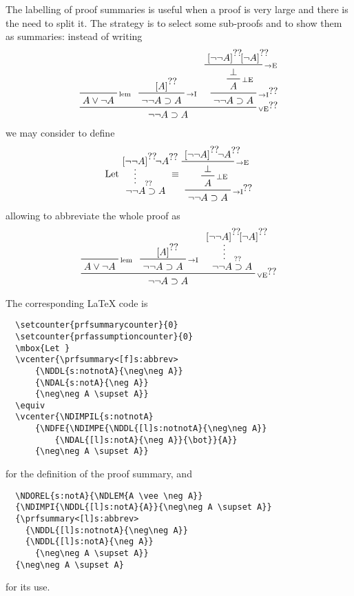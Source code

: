 \documentclass{amsart}
\begin{document}
The labelling of proof summaries is useful when a proof is very large
and there is the need to split it. The strategy is to select some
sub-proofs and to show them as summaries: instead of writing
\begin{displaymath}
  \setcounter{prfsummarycounter}{0}
  \setcounter{prfassumptioncounter}{0}
  \NDOREL{a:notA}{\NDLEM{A \vee \neg A}}
  {\NDIMPI{\NDDL{[l]a:notA}{A}}{\neg\neg A \supset A}}
  {\NDIMPIL{a:notnotA}
    {\NDFE{\NDIMPE{\NDDL{[l]a:notnotA}{\neg\neg A}}
        {\NDDL{[l]a:notA}{\neg A}}{\bot}}{A}} 
    {\neg\neg A \supset A}}
  {\neg\neg A \supset A}
\end{displaymath}
we may consider to define
\begin{displaymath}
  \setcounter{prfsummarycounter}{0}
  \setcounter{prfassumptioncounter}{0}
  \mbox{Let }
  \vcenter{\prfsummary<[f]s:abbrev>
      {\NDDL{s:notnotA}{\neg\neg A}}
      {\NDAL{s:notA}{\neg A}}
      {\neg\neg A \supset A}}
  \equiv
  \vcenter{\NDIMPIL{s:notnotA}
      {\NDFE{\NDIMPE{\NDDL{[l]s:notnotA}{\neg\neg A}}
          {\NDAL{[l]s:notA}{\neg A}}{\bot}}{A}} 
      {\neg\neg A \supset A}}
\end{displaymath}
allowing to abbreviate the whole proof as
\begin{displaymath}
  \NDOREL{s:notA}{\NDLEM{A \vee \neg A}}
  {\NDIMPI{\NDDL{[l]s:notA}{A}}{\neg\neg A \supset A}}
  {\prfsummary<s:abbrev>
    {\NDDL{[l]s:notnotA}{\neg\neg A}}
    {\NDDL{[l]s:notA}{\neg A}}
      {\neg\neg A \supset A}}
  {\neg\neg A \supset A}
\end{displaymath}

The corresponding \LaTeX{} code is
\begin{verbatim}
  \setcounter{prfsummarycounter}{0}
  \setcounter{prfassumptioncounter}{0}
  \mbox{Let }
  \vcenter{\prfsummary<[f]s:abbrev>
      {\NDDL{s:notnotA}{\neg\neg A}}
      {\NDAL{s:notA}{\neg A}}
      {\neg\neg A \supset A}}
  \equiv
  \vcenter{\NDIMPIL{s:notnotA}
      {\NDFE{\NDIMPE{\NDDL{[l]s:notnotA}{\neg\neg A}}
          {\NDAL{[l]s:notA}{\neg A}}{\bot}}{A}} 
      {\neg\neg A \supset A}}
\end{verbatim}
for the definition of the proof summary, and
\begin{verbatim}
  \NDOREL{s:notA}{\NDLEM{A \vee \neg A}}
  {\NDIMPI{\NDDL{[l]s:notA}{A}}{\neg\neg A \supset A}}
  {\prfsummary<[l]s:abbrev>
    {\NDDL{[l]s:notnotA}{\neg\neg A}}
    {\NDDL{[l]s:notA}{\neg A}}
      {\neg\neg A \supset A}}
  {\neg\neg A \supset A}
\end{verbatim}
for its use.
\end{document}
